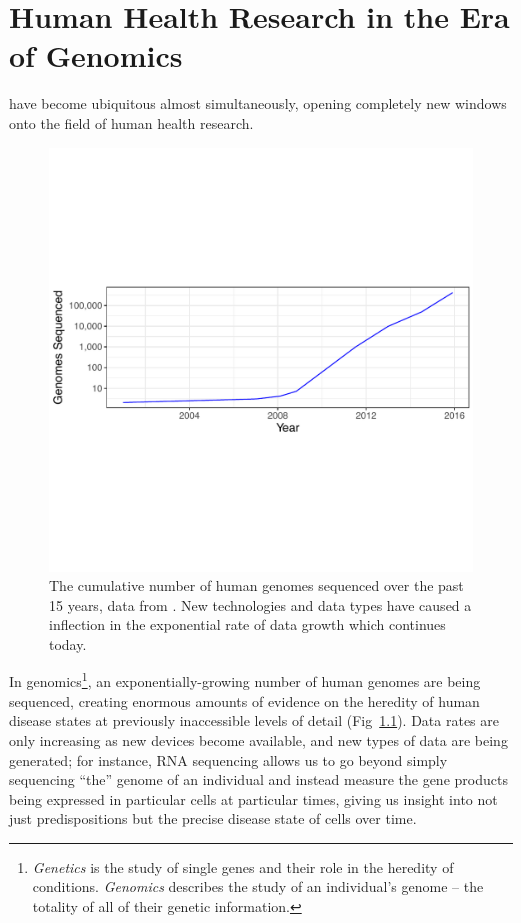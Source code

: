 \documentclass[twoside,symmetric,sfsidenotes,notoc]{tufte-book}
\begin{document}
\chapter{Human Health Research in the Era of Genomics}
\label{ch:health-data-at-scale}

 have 
become ubiquitous almost simultaneously, opening completely new windows onto the field
of human health research.  

\begin{figure}
 \includegraphics{cumulative_genomes.pdf}
  \caption[Cumulative number of human genomes sequenced]{The cumulative number of human genomes sequenced over the past 15 years,
    data from \protect\citep{stephens2015big}.  New technologies and data types have caused a inflection in the exponential rate
    of data growth which continues today.}
  \label{fig:exponential-growth}
\end{figure}

In genomics\footnote{\textit{Genetics} is the study of single genes
and their role in the heredity of conditions. \textit{Genomics}
describes the study of an individual's genome -- the totality of
all of their genetic information.}, an exponentially-growing number of human genomes are
being sequenced, creating enormous amounts of evidence on the heredity
of human disease states at previously inaccessible levels of detail
(Fig~\ref{fig:exponential-growth}).  Data rates are only increasing as
new devices become available, and new types of data are being
generated; for instance, RNA sequencing allows us to go beyond
simply sequencing ``the'' genome of an individual and instead measure
the gene products being expressed in particular cells at particular
times, giving us insight into not just predispositions but the precise
disease state of cells over time.
\end{document}
